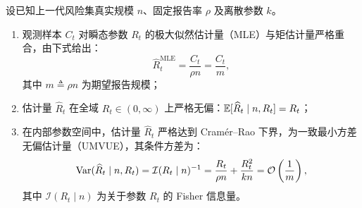\begin{proposition}\label{prop:prop1}
设已知上一代风险集真实规模 $n$、固定报告率 $\rho$ 及离散参数 $k$。
\begin{enumerate}[label=(\roman*)]
    \item 观测样本 $C_t$ 对瞬态参数 $R_t$ 的极大似然估计量（MLE）与矩估计量严格重合，由下式给出：
    \begin{equation}
    \widehat{R}_t^{\text{MLE}} = \frac{C_t}{\rho n} = \frac{C_t}{m}, \label{eq:estimator_def}
    \end{equation}
    其中 $m \triangleq \rho n$ 为期望报告规模；
    \item 估计量 $\widehat{R}_t$ 在全域 $R_t \in (0, \infty)$ 上严格无偏：$\operatorname{\mathbb{E}}[\widehat{R}_t \mid n, R_t] = R_t$；
    \item 在内部参数空间中，估计量 $\widehat{R}_t$ 严格达到 Cramér--Rao 下界，为一致最小方差无偏估计量（UMVUE），其条件方差为：
    \begin{equation}
    \operatorname{Var}(\widehat{R}_t \mid n, R_t) = \mathcal{I}(R_t \mid n)^{-1} = \frac{R_t}{\rho n} + \frac{R_t^2}{k n} = \mathcal{O}\left( \frac{1}{m} \right), \label{eq:var_prop1}
    \end{equation}
    其中 $\mathcal{I}(R_t \mid n)$ 为关于参数 $R_t$ 的 Fisher 信息量。
\end{enumerate}
\end{proposition}

